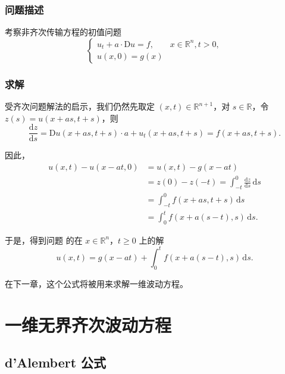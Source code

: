 \documentclass[a4paper, 12pt, oneside]{article} %
\numberwithin{subsection}{section}
\numberwithin{subsubsection}{subsection}
\theoremstyle{plain}
\theoremstyle{definition}
\theoremstyle{remark}
\begin{document}
		\subsubsection{问题描述}
		考察非齐次传输方程的初值问题
		\begin{equation}
			\begin{cases}
				u_t + a \cdot \mathrm{D}u = f, & x \in \mathbb{R}^n, t > 0, \\
				u(x,0) = g(x)
			\end{cases}
		\end{equation}
		
		\subsubsection{求解}
		受齐次问题解法的启示，我们仍然先取定 \((x, t) \in \mathbb{R}^{n+1}\)，对 \(s \in \mathbb{R}\)，令 \(z(s) = u(x + a s, t + s)\)，则
		\begin{equation}
			\frac{\mathrm{d}z}{\mathrm{d}s} = \mathrm{D}u(x + a s, t + s) \cdot a + u_t(x + a s, t + s) = f(x + a s, t + s).
		\end{equation}
		
		因此，
		\begin{equation}
			\begin{aligned}
				u(x, t) -	u(x-at,0)&= u(x, t)-g(x - a t) \\
				&= z(0) - z(-t) = \int_{-t}^0 \frac{\mathrm{d}z}{\mathrm{d}s} \, \mathrm{d}s \\
				&= \int_{-t}^0 f(x + a s, t + s) \, \mathrm{d}s \\
				&= \int_0^t f(x + a (s - t), s) \, \mathrm{d}s.
			\end{aligned}
		\end{equation}
		
		于是，得到问题 的在 \(x \in \mathbb{R}^n\)，\(t \geq 0\) 上的解
		\begin{equation}\label{eq:transport_nonhomo_sol}
			u(x, t) = g(x - a t) + \int_0^t f(x + a (s - t), s) \, \mathrm{d}s.
		\end{equation}
		
		在下一章，这个公式将被用来求解一维波动方程。
		
		
		
		
		
		\section{一维无界齐次波动方程}
		
		\subsection{d’Alembert 公式}
		
\end{document}
